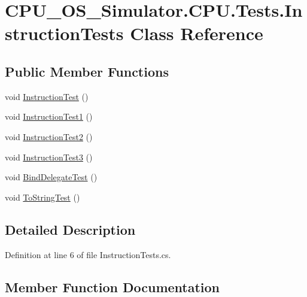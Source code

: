 \hypertarget{class_c_p_u___o_s___simulator_1_1_c_p_u_1_1_tests_1_1_instruction_tests}{}\section{C\+P\+U\+\_\+\+O\+S\+\_\+\+Simulator.\+C\+P\+U.\+Tests.\+Instruction\+Tests Class Reference}
\label{class_c_p_u___o_s___simulator_1_1_c_p_u_1_1_tests_1_1_instruction_tests}
\subsection*{Public Member Functions}
\begin{DoxyCompactItemize}
\item 
void \hyperlink{class_c_p_u___o_s___simulator_1_1_c_p_u_1_1_tests_1_1_instruction_tests_a1305b71dfc46b89f314713c65bac2e7c}{Instruction\+Test} ()
\item 
void \hyperlink{class_c_p_u___o_s___simulator_1_1_c_p_u_1_1_tests_1_1_instruction_tests_abc74bfc3bc7d34eba9e033327a642e96}{Instruction\+Test1} ()
\item 
void \hyperlink{class_c_p_u___o_s___simulator_1_1_c_p_u_1_1_tests_1_1_instruction_tests_a4fd3d1dfc697b33ea1a2b415f7c45119}{Instruction\+Test2} ()
\item 
void \hyperlink{class_c_p_u___o_s___simulator_1_1_c_p_u_1_1_tests_1_1_instruction_tests_a5ed7093663951b67219cc7669295d2d1}{Instruction\+Test3} ()
\item 
void \hyperlink{class_c_p_u___o_s___simulator_1_1_c_p_u_1_1_tests_1_1_instruction_tests_a08e3bc0d16c5a749657986cfb06d7544}{Bind\+Delegate\+Test} ()
\item 
void \hyperlink{class_c_p_u___o_s___simulator_1_1_c_p_u_1_1_tests_1_1_instruction_tests_a4966086b23824a6795e3325ab747eeba}{To\+String\+Test} ()
\end{DoxyCompactItemize}


\subsection{Detailed Description}


Definition at line 6 of file Instruction\+Tests.\+cs.



\subsection{Member Function Documentation}
\hypertarget{class_c_p_u___o_s___simulator_1_1_c_p_u_1_1_tests_1_1_instruction_tests_a08e3bc0d16c5a749657986cfb06d7544}{}
